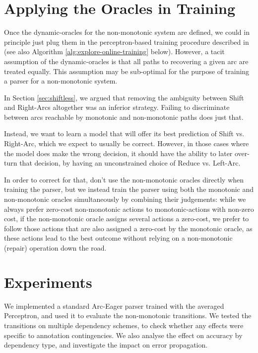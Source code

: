 \documentclass[11pt,letterpaper]{article}
\begin{document}
\section{Applying the Oracles in Training}

Once the dynamic-oracles for the non-monotonic system are defined, we could in
principle just plug them in the perceptron-based training procedure described
in \citet{goldberg:12} (see also Algorithm \ref{alg:explore-online-training}
below).
However, a tacit assumption of the dynamic-oracles is that all paths to
recovering a given arc are treated equally. This assumption may be sub-optimal
for the purpose of training a parser for a non-monotonic system.

In Section \ref{sec:shiftless}, we argued that removing the ambiguity between
Shift and Right-Arcs altogether was an inferior strategy. Failing to discriminate
between arcs reachable by monotonic and non-monotonic paths does just that.

Instead,  we want to learn a model that will offer its best prediction of Shift vs.
Right-Arc, which we expect to usually be correct.  However, in those cases
where the model does make the wrong decision, it should have the ability to later over-turn that decision, by having an unconstrained
choice of Reduce vs. Left-Arc.

In order to correct for that, don't use the non-monotonic oracles directly
when training the parser, but we instead train the parser using both the
monotonic and non-monotonic oracles simultaneously by combining their
judgements: while we always prefer zero-cost non-monotonic actions to
monotonic-actions with non-zero cost, if the non-monotonic oracle assigns several actions a zero-cost,
we prefer to follow those actions that are also assigned a zero-cost by the
monotonic oracle, as these actions lead to the best outcome without
relying on a non-monotonic (repair) operation down the road.

\section{Experiments}

We implemented a standard Arc-Eager parser trained with the averaged Perceptron,
and used it to evaluate the non-monotonic transitions. We tested the transitions on
multiple dependency schemes, to check whether any effects were specific to annotation
contingencies. We also analyse the effect on accuracy by dependency type, and
investigate the impact on error propagation.
\end{document}
